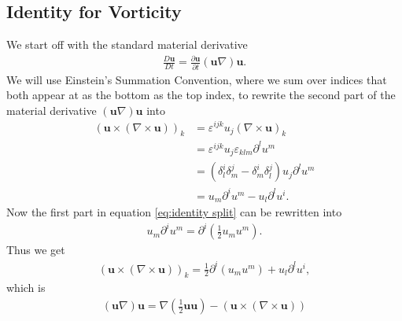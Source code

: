 \subsection{Identity for Vorticity}
We start off with the standard material derivative
\begin{align}
    \frac{D\mathbf{u}}{Dt} = \frac{\partial \mathbf{u}}{\partial t}
    (\mathbf{u}\nabla)\mathbf{u}.
\end{align}
We will use Einstein's Summation Convention, where we sum over indices that
both appear at as the bottom as the top index, to rewrite the second part of
the material derivative $(\mathbf{u}\nabla)\mathbf{u}$ into
\begin{align}
    (\mathbf{u}\times (\nabla \times \mathbf{u}))_k
    &= \varepsilon^{ijk}u_j(\nabla \times  \mathbf{u})_k \\
    &= \varepsilon^{ijk}u_j\varepsilon_{klm}\partial^l u^m\\
    &=(\delta^i_l\delta^j_m-\delta^i_m\delta^j_l)u_j\partial^l u^m\\
    &=u_m\partial^i u^m - u_l \partial^l u^i.\label{eq:identity split}
\end{align}
Now the first part in equation \ref{eq:identity split} can be rewritten into
\begin{align}
    u_m\partial^i u^m =\partial^i (\frac{1}{2}u_mu^m) .
\end{align}
Thus we get
\begin{align}
    (\mathbf{u}\times (\nabla \times \mathbf{u}))_k
    = \frac{1}{2}\partial^i(u_m u^m) + u_l \partial^l u^i,
\end{align}
which is
\begin{align}
    (\mathbf{u}\nabla)\mathbf{u} = \nabla(\frac{1}{2}\mathbf{u}\mathbf{u}) -
    \left(\mathbf{u}\times (\nabla \times  \mathbf{u})\right)
\end{align}
